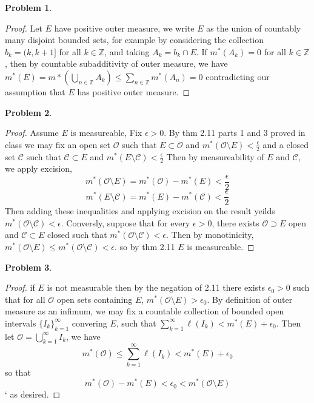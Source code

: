 \documentclass{article}
\newcommand{\Z}{\mathbb{Z}}
\newtheorem{prb}{Problem}
\begin{document}
\begin{prb}  \end{prb} 
\begin{proof} 
	Let $E$ have positive outer measure, we write $E$ as the union of countably many disjoint bounded sets, for example by considering 
	the collection $b_k = (k, k+1]$ for all $k \in \mathbb{Z}$, and taking $A_k  = b_k \cap E$. If $m^*(A_k) = 0$ for all $k \in \Z$, 
	then by countable subadditivity of outer measure, we have $m^*(E) = m*(\bigcup_{n \in \Z} A_k) \leq \sum_{n \in \Z} m^*(A_n)= 0$
	contradicting our assumption that $E$ has positive outer measure. 
\end{proof} 

\begin{prb}  \end{prb} 
\begin{proof} 
	Assume $E$ is measureable,
	Fix $\epsilon  > 0$. 
	By thm 2.11 parts 1 and 3 proved in class we may fix an open set $\mathcal{O}$ such that $E \subset \mathcal{O}$ and 
	$m^*(\mathcal{O} \setminus E) < \frac{\epsilon}{2} $ and a closed set $\mathcal{C}$ such that $\mathcal{C} \subset E$ and 
	$m^*(E \setminus \mathcal{C}) < \frac{\epsilon}{2}  $ Then by measureability of $E$ and $\mathcal{C}$, we apply excision, 
	\[		m^*(\mathcal{O} \setminus E) = m^*(\mathcal{O}) - m^*(E) < \frac{\epsilon}{2} \] 
	\[ m^* (E \setminus \mathcal{C}) = m^*(E) - m^*(\mathcal{C}) < \frac{\epsilon}{2} \] 
	Then adding these inequalities and applying excision
	on the result yeilds $m^*(\mathcal{O} \setminus \mathcal{C}) < \epsilon$. Conversly, suppose that for every $\epsilon > 0$, there exists $\mathcal{O} 
	\supset E$ open 
	and $\mathcal{C} \subset E$ closed such that $m^*(\mathcal{O} \setminus \mathcal{C}) < \epsilon$. Then 
	by monotinicity, $m^*(\mathcal{O}\setminus E) \leq m^*(\mathcal{O} \setminus \mathcal{C}) < \epsilon$. 
	so by thm 2.11 $E$ is measureable. 
\end{proof}

\begin{prb}  \end{prb} 
\begin{proof} 
	if $E$ is not measurable then by the negation of 2.11 there exists $\epsilon_0 > 0$ such that for all $\mathcal{O}$ open sets 
	containing $E$, $m^*(\mathcal{O} \setminus E) > \epsilon_0$. By definition of outer measure as an infimum, we may fix a countable 
	collection of bounded open intervals $\{I_k\}_{k=1}^\infty$ convering $E$, such that $\sum_{k = 1}^\infty \ell(I_k) < m^*(E) + \epsilon_0$. 
	Then let $\mathcal{O} = \bigcup_{k=1}^\infty I_k$, we have 
	\[ m^*(\mathcal{O}) \leq \sum_{k=1}^\infty \ell(I_k) < m^*(E) + \epsilon_0 \] 
	so that 
	\[ m^*(\mathcal{O})- m^*(E) < \epsilon_0 < m^*(\mathcal{O} \setminus E)\]`
	as desired. 
\end{proof} 
\end{document}
